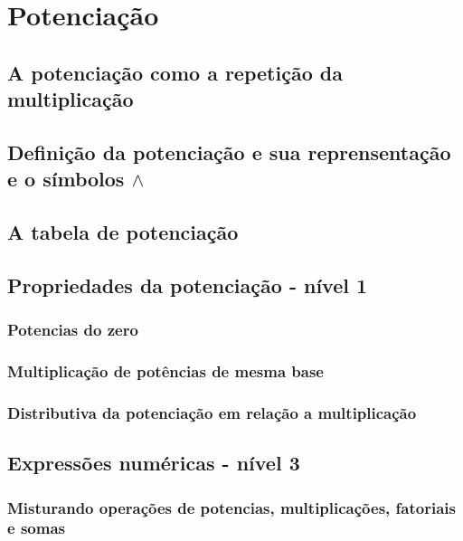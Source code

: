\chapter[Potenciação]{Potenciação}

\section{A potenciação como a repetição da multiplicação}

\section{Definição da potenciação e sua reprensentação e o símbolos $ \wedge $ }

\section{A tabela de potenciação}

\section{Propriedades da potenciação - nível 1}

\subsection{Potencias do zero}

\subsection{Multiplicação de potências de mesma base}

\subsection{Distributiva da potenciação em relação a multiplicação}

\section{Expressões numéricas - nível 3}

\subsection{Misturando operações de potencias, multiplicações, fatoriais e somas}